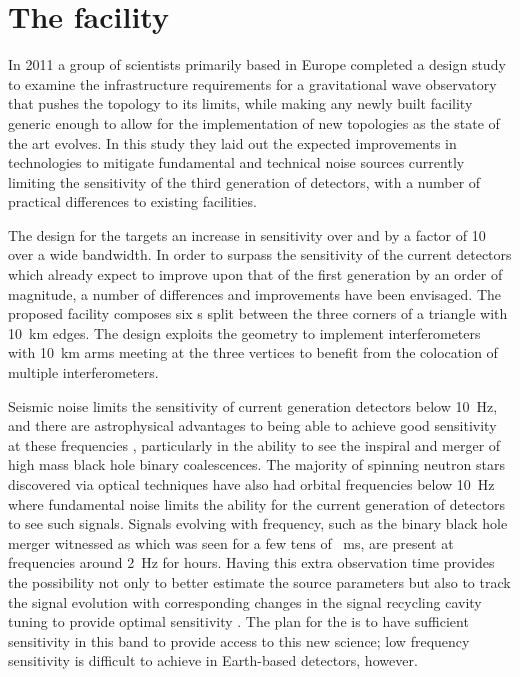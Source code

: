\section{The \ET{} facility}
In 2011 a group of scientists primarily based in Europe completed a design study \cite{ET2011} to examine the infrastructure requirements for a gravitational wave observatory that pushes the \MI{} topology to its limits, while making any newly built facility generic enough to allow for the implementation of new topologies as the state of the art evolves. In this study they laid out the expected improvements in technologies to mitigate fundamental and technical noise sources currently limiting the sensitivity of the third generation of detectors, with a number of practical differences to existing facilities.

The design for the \ET{} targets an increase in sensitivity over \ALIGO{} and \AVIRGO{} by a factor of \num{10} over a wide bandwidth. In order to surpass the sensitivity of the current detectors which already expect to improve upon that of the first generation by an order of magnitude, a number of differences and improvements have been envisaged. The proposed \ET{} facility composes six \DRFPMI{}s split between the three corners of a triangle with \SI{10}{\kilo\meter} edges. The design exploits the geometry to implement interferometers with \SI{10}{\kilo\meter} arms meeting at the three vertices to benefit from the colocation of multiple interferometers.

Seismic noise limits the sensitivity of current generation detectors below \SI{10}{\hertz}, and there are astrophysical advantages to being able to achieve good sensitivity at these frequencies \cite{Sathyaprakash2012}, particularly in the ability to see the inspiral and merger of high mass black hole binary coalescences. The majority of spinning neutron stars discovered via optical techniques have also had orbital frequencies below \SI{10}{\hertz} where fundamental noise limits the ability for the current generation of detectors to see such signals. Signals evolving with frequency, such as the binary black hole merger witnessed as \GWFIRSTEVENT{} \cite{Abbott2016} which was seen for a few tens of \SI{}{\milli\second}, are present at frequencies around \SI{2}{\hertz} for hours. Having this extra observation time provides the possibility not only to better estimate the source parameters but also to track the signal evolution with corresponding changes in the signal recycling cavity tuning to provide optimal sensitivity \cite{Heinzel2002, Simakov2014}. The plan for the \ET{} is to have sufficient sensitivity in this band to provide access to this new science; low frequency sensitivity is difficult to achieve in Earth-based detectors, however.

